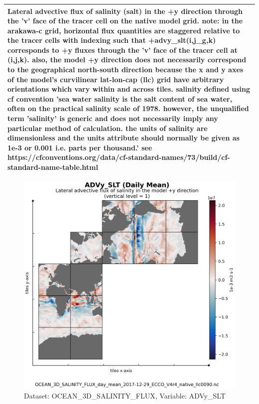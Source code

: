 \begin{longtable}{|m{}|m{}|m{}|m{}|}
\multicolumn{4}{|p{1\textwidth}|}{\footnotesize{{Lateral advective flux of salinity (salt) in the +y direction through the 'v' face of the tracer cell on the native model grid. note: in the arakawa-c grid, horizontal flux quantities are staggered relative to the tracer cells with indexing such that +advy\_slt(i,j\_g,k) corresponds to +y fluxes through the 'v' face of the tracer cell at (i,j,k). also, the model +y direction does not necessarily correspond to the geographical north-south direction because the x and y axes of the model's curvilinear lat-lon-cap (llc) grid have arbitrary orientations which vary within and across tiles. salinity defined using cf convention 'sea water salinity is the salt content of sea water, often on the practical salinity scale of 1978. however, the unqualified term 'salinity' is generic and does not necessarily imply any particular method of calculation. the units of salinity are dimensionless and the units attribute should normally be given as 1e-3 or 0.001 i.e. parts per thousand.' see https://cfconventions.org/data/cf-standard-names/73/build/cf-standard-name-table.html}}} \\ \hline
\end{longtable}

\begin{figure}[H]
\centering
\includegraphics[scale=0.55]{../images/plots/v4r4/native_plots/Ocean_Three-Dimensional_Salinity_Fluxes/ADVy_SLT.png}
\caption{Dataset: OCEAN\_3D\_SALINITY\_FLUX, Variable: ADVy\_SLT}
\label{tab:table-OCEAN_3D_SALINITY_FLUX_ADVy_SLT-Plot}
\end{figure}
\newpage
\pagebreak
